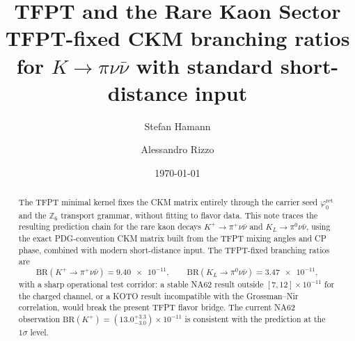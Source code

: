 \documentclass[11pt,a4paper]{article}
\title{\textbf{TFPT and the Rare Kaon Sector}\\[4pt]\large TFPT-fixed CKM branching ratios
for $K\to\pi\nu\bar\nu$ with standard short-distance input}
\author{Stefan Hamann \and Alessandro Rizzo}
\date{\today}
\theoremstyle{definition}
\theoremstyle{remark}
\newcommand{\phiz}{\varphi_{0}^{\mathrm{ret}}}
\newcommand{\BR}{\mathrm{BR}}
\numberwithin{equation}{section}
\begin{document}
\maketitle

\begin{abstract}
The TFPT minimal kernel fixes the CKM matrix entirely through the carrier seed
$\phiz$ and the $\mathbb Z_6$ transport grammar, without fitting to flavor data.
This note traces the resulting prediction chain for the rare
kaon decays $K^+\to\pi^+\nu\bar\nu$ and $K_L\to\pi^0\nu\bar\nu$,
using the exact PDG-convention CKM matrix built from the TFPT mixing
angles and CP phase, combined with modern short-distance input.
The TFPT-fixed branching ratios are
\[
\BR(K^+\to\pi^+\nu\bar\nu)=\num{9.40e-11},
\qquad
\BR(K_L\to\pi^0\nu\bar\nu)=\num{3.47e-11},
\]
with a sharp operational test corridor: a stable NA62 result outside
$[7,12]\times 10^{-11}$ for the charged channel, or a KOTO result
incompatible with the Grossman--Nir correlation, would break the
present TFPT flavor bridge. The current NA62 observation
$\BR(K^+)=(13.0^{+3.3}_{-3.0})\times 10^{-11}$ is consistent with
the prediction at the $1\sigma$ level.
\end{abstract}

\tableofcontents

\bigskip
\end{document}
